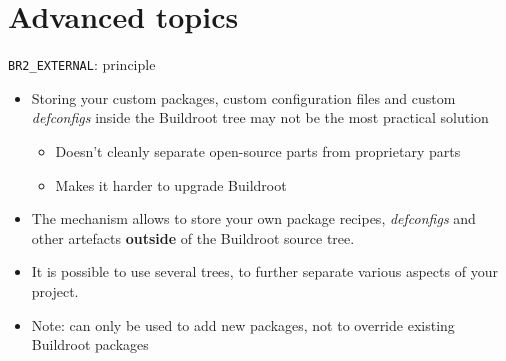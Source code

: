 \section{Advanced topics}

\begin{frame}{{\tt BR2\_EXTERNAL}: principle}
  \begin{itemize}
  \item Storing your custom packages, custom configuration files and
    custom {\em defconfigs} inside the Buildroot tree may not be the
    most practical solution
    \begin{itemize}
    \item Doesn't cleanly separate open-source parts from proprietary parts
    \item Makes it harder to upgrade Buildroot
    \end{itemize}
  \item The  mechanism allows to store your own
    package recipes, {\em defconfigs} and other artefacts {\bf
      outside} of the Buildroot source tree.
  \item It is possible to use several  trees, to
    further separate various aspects of your project.
  \item Note: can only be used to add new packages, not to override
    existing Buildroot packages
  \end{itemize}
\end{frame}


